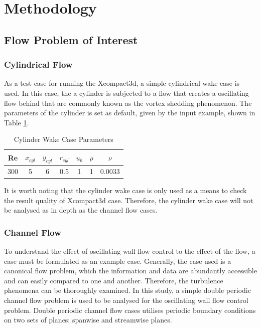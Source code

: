 \clearpage
\section{Methodology}
\label{sec:Methodology}



\subsection{Flow Problem of Interest}
\label{sec:Flow problem of interest}
\subsubsection{Cylindrical Flow}
As a test case for running the Xcompact3d, a simple cylindrical wake case is used. In this case, the a cylinder is subjected to a flow that creates a oscillating flow behind that are commonly known as the vortex shedding phenomenon. The parameters of the cylinder is set as default, given by the input example, shown in Table \ref{tab:cyl_wake_case}.

\begin{table}[h!]
	\caption{Cylinder Wake Case Parameters}
	\centering
	\label{tab:cyl_wake_case}
	\begin{tabular}{ccccccc}
		\hline
		Re  & $x_{cyl}$ & $y_{cyl}$ & $r_{cyl}$ & $u_b$ & $\rho$ & $\nu$   \\ \hline
		300 & 5       & 6       & 0.5     & 1     & 1      & 0.0033 \\ \hline
	\end{tabular}
\end{table}

It is worth noting that the cylinder wake case is only used as a means to check the result quality of Xcompact3d case. Therefore, the cylinder wake case will not be analysed as in depth as the channel flow cases.

\subsubsection{Channel Flow}
To understand the effect of oscillating wall flow control to the effect of the flow, a case must be formulated as an example case. Generally, the case used is a canonical flow problem, which the information and data are abundantly accessible and can easily compared to one and another. Therefore, the turbulence phenomena can be thoroughly examined. In this study, a simple double periodic channel flow problem is used to be analysed for the oscillating wall flow control problem. Double periodic channel flow cases utilises periodic boundary conditions on two sets of planes: spanwise and streamwise planes. 

